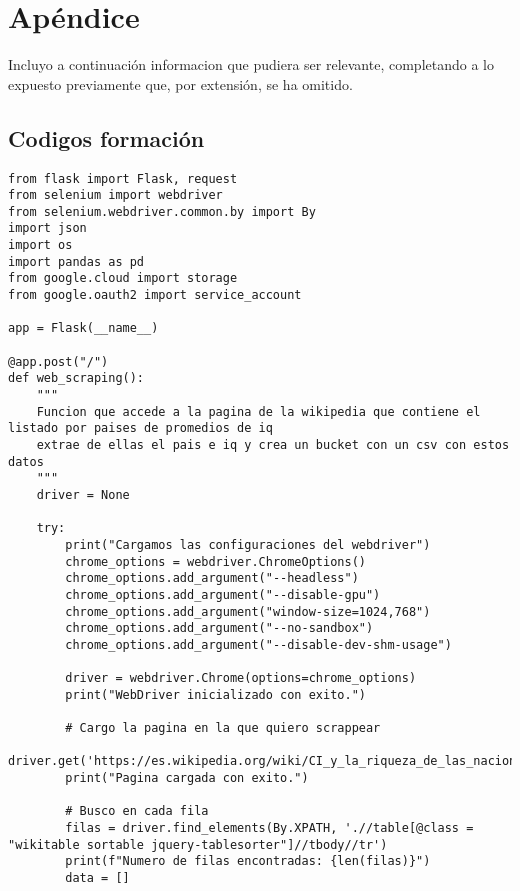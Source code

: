 \chapter*{Apéndice}
Incluyo a continuación informacion que pudiera ser relevante, completando a lo expuesto previamente que, por extensión, se ha omitido.
%
%
%
\section{Codigos formación}
\begin{lstlisting}[caption = {Código de web scrapping completo.}, label = WBSCode]
from flask import Flask, request
from selenium import webdriver
from selenium.webdriver.common.by import By
import json
import os
import pandas as pd
from google.cloud import storage
from google.oauth2 import service_account

app = Flask(__name__)

@app.post("/")
def web_scraping():
    """
    Funcion que accede a la pagina de la wikipedia que contiene el listado por paises de promedios de iq
    extrae de ellas el pais e iq y crea un bucket con un csv con estos datos
    """
    driver = None

    try:
        print("Cargamos las configuraciones del webdriver")
        chrome_options = webdriver.ChromeOptions()
        chrome_options.add_argument("--headless")
        chrome_options.add_argument("--disable-gpu")
        chrome_options.add_argument("window-size=1024,768")
        chrome_options.add_argument("--no-sandbox")
        chrome_options.add_argument("--disable-dev-shm-usage") 

        driver = webdriver.Chrome(options=chrome_options)
        print("WebDriver inicializado con exito.")

        # Cargo la pagina en la que quiero scrappear
        driver.get('https://es.wikipedia.org/wiki/CI_y_la_riqueza_de_las_naciones')
        print("Pagina cargada con exito.")
        
        # Busco en cada fila
        filas = driver.find_elements(By.XPATH, './/table[@class = "wikitable sortable jquery-tablesorter"]//tbody//tr')
        print(f"Numero de filas encontradas: {len(filas)}")
        data = []
        

\end{lstlisting}
